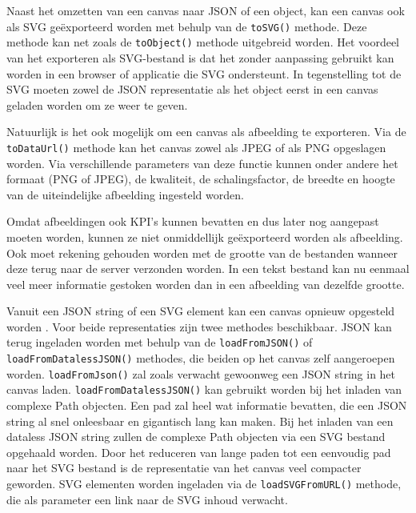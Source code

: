 Naast het omzetten van een canvas naar JSON of een object, kan een canvas ook als SVG ge\"{e}xporteerd worden met behulp van de \texttt{toSVG()} methode. Deze methode kan net zoals de \texttt{toObject()} methode uitgebreid worden. Het voordeel van het exporteren als SVG-bestand is dat het zonder aanpassing gebruikt kan worden in een browser of applicatie die SVG ondersteunt. In tegenstelling tot de SVG moeten zowel de JSON representatie als het object eerst in een canvas geladen worden om ze weer te geven. 

Natuurlijk is het ook mogelijk om een canvas als afbeelding te exporteren. Via de \texttt{toDataUrl()} methode kan het canvas zowel als JPEG of als PNG opgeslagen worden. Via verschillende parameters van deze functie kunnen onder andere het formaat (PNG of JPEG), de kwaliteit, de schalingsfactor, de breedte en hoogte van de uiteindelijke afbeelding ingesteld worden.

Omdat afbeeldingen ook KPI's kunnen bevatten en dus later nog aangepast moeten worden, kunnen ze niet onmiddellijk ge\"{e}xporteerd worden als afbeelding. Ook moet rekening gehouden worden met de grootte van de bestanden wanneer deze terug naar de server verzonden worden. In een tekst bestand kan nu eenmaal veel meer informatie gestoken worden dan in een afbeelding van dezelfde grootte. 

Vanuit een JSON string of een SVG element kan een canvas opnieuw opgesteld worden \cite{SVGElement}. Voor beide representaties zijn twee methodes beschikbaar. JSON kan terug ingeladen worden met behulp van de \texttt{loadFromJSON()} of \texttt{loadFromDatalessJSON()} methodes, die beiden op het canvas zelf aangeroepen worden. \texttt{loadFromJson()} zal zoals verwacht gewoonweg een JSON string in het canvas laden. \texttt{loadFromDatalessJSON()} kan gebruikt worden bij het inladen van complexe Path objecten. Een pad zal heel wat informatie bevatten, die een JSON string al snel onleesbaar en gigantisch lang kan maken. Bij het inladen van een dataless JSON string zullen de complexe Path objecten via een SVG bestand opgehaald worden. Door het reduceren van lange paden tot een eenvoudig pad naar het SVG bestand is de representatie van het canvas veel compacter geworden. SVG elementen worden ingeladen via de \texttt{loadSVGFromURL()} methode, die als parameter een link naar de SVG inhoud verwacht. 


